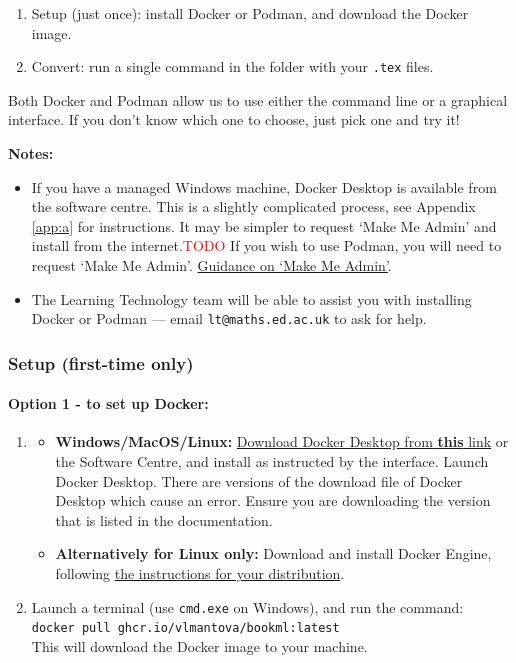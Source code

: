 \begin{enumerate}
    \item Setup (just once): install Docker or Podman, and download the Docker image.
    \item Convert: run a single command in the folder with your \verb|.tex| files.
\end{enumerate}

Both Docker and Podman allow us to use either the command line or a graphical interface. If you don't know which one to choose, just pick one and try it!

\noindent \textbf{Notes: }
\begin{itemize}
    \item If you have a managed Windows machine, Docker Desktop is available from the software centre. This is a slightly complicated process, 
    see Appendix \ref{app:a} for instructions. It may be simpler to request `Make Me Admin' and install from the internet.\textcolor{red}{TODO}
    If you wish to use Podman, you will need to request `Make Me Admin'.
    \href{https://www.ed.ac.uk/information-services/computing/desktop-personal/supported/windows-10/makemeadmin}{Guidance on `Make Me Admin'}.
    \item The Learning Technology team will be able to assist you with installing Docker or Podman --- email \verb|lt@maths.ed.ac.uk| to ask for help.
\end{itemize}

\subsubsection{Setup (first-time only)}
\label{sssec:setup}

\paragraph{Option 1 - to set up Docker:}

\begin{enumerate}
    \item
        \begin{itemize}
            \item \textbf{Windows/MacOS/Linux:} \href{https://docs.docker.com/desktop/install/windows-install/}{Download Docker Desktop from \textbf{this} link} or the Software Centre, and install as instructed by the interface. Launch Docker Desktop. 
There are versions of the download file of Docker Desktop which cause an error. Ensure you are downloading the version that is listed in the documentation.
            \item \textbf{Alternatively for Linux only:} Download and install Docker Engine, following \href{https://docs.docker.com/engine/install/}{the instructions for your distribution}.
        \end{itemize}
    \item Launch a terminal (use \verb|cmd.exe| on Windows), and run the command:\\
        \verb|docker pull ghcr.io/vlmantova/bookml:latest|\\
        This will download the Docker image to your machine.
\end{enumerate}

